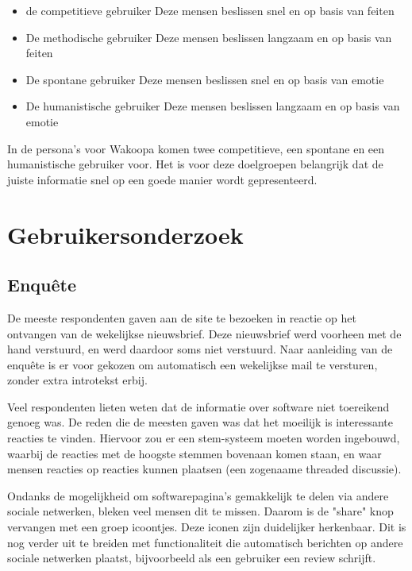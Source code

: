 \documentclass[a4paper, 10pt, pdftex]{report}
\begin{document}
      \begin{itemize}
        \item de competitieve gebruiker
          Deze mensen beslissen snel en op basis van feiten
        \item De methodische gebruiker
          Deze mensen beslissen langzaam en op basis van feiten
        \item De spontane gebruiker
          Deze mensen beslissen snel en op basis van emotie
        \item De humanistische gebruiker
          Deze mensen beslissen langzaam en op basis van emotie
      \end{itemize}

      In de persona's voor Wakoopa komen twee competitieve, een spontane en een humanistische gebruiker voor. Het is voor deze doelgroepen belangrijk dat de juiste informatie snel op een goede manier wordt gepresenteerd.

    \section{Gebruikersonderzoek}
      \subsection{Enqu\^ete}
        De meeste respondenten gaven aan de site te bezoeken in reactie op het ontvangen van de wekelijkse nieuwsbrief. Deze nieuwsbrief werd voorheen met de hand verstuurd, en werd daardoor soms niet verstuurd. Naar aanleiding van de enqu\^ete is er voor gekozen om automatisch een wekelijkse mail te versturen, zonder extra introtekst erbij.

        Veel respondenten lieten weten dat de informatie over software niet toereikend genoeg was. De reden die de meesten gaven was dat het moeilijk is interessante reacties te vinden. Hiervoor zou er een stem-systeem moeten worden ingebouwd, waarbij de reacties met de hoogste stemmen bovenaan komen staan, en waar mensen reacties op reacties kunnen plaatsen (een zogenaame threaded discussie).

        Ondanks de mogelijkheid om softwarepagina's gemakkelijk te delen via andere sociale netwerken, bleken veel mensen dit te missen. Daarom is de "share" knop vervangen met een groep icoontjes. Deze iconen zijn duidelijker herkenbaar. Dit is nog verder uit te breiden met functionaliteit die automatisch berichten op andere sociale netwerken plaatst, bijvoorbeeld als een gebruiker een review schrijft.
\end{document}
